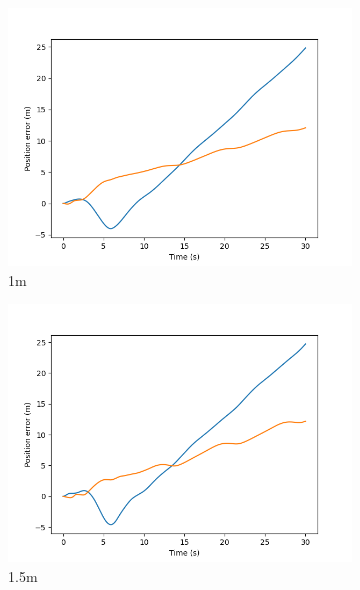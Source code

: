 \documentclass[class=article, crop=false]{standalone}
\begin{document}
\begin{figure}
\begin{subfigure}[b]{0.48\textwidth}
        \label{}
    \end{subfigure}
    \vfill
        \begin{subfigure}[b]{0.48\textwidth}
        \centering
        \includegraphics{scenario1/rov-0m/1.0m/usv_pos_error_uncontrolled}
        \caption{1m}
        \label{}
    \end{subfigure}
    \hfill
        \begin{subfigure}[b]{0.48\textwidth}
        \centering
        \includegraphics{scenario1/rov-0m/1.5m/usv_pos_error_uncontrolled}
        \caption{1.5m}
        \label{}
    \end{subfigure}
    \vfill
        \begin{subfigure}[b]{0.48\textwidth}

\end{subfigure}
\end{figure}
\end{document}
